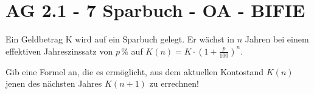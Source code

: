 \section{AG 2.1 - 7 Sparbuch - OA - BIFIE}

\begin{beispiel}[AG 2.1]{1} %
Ein Geldbetrag K wird auf ein Sparbuch gelegt. Er wächst in $n$ Jahren bei einem effektiven Jahreszinssatz von $p\,\%$ auf $K(n)=K\cdot \left(1+\frac{p}{100}\right)^n$.

\leer

Gib eine Formel an, die es ermöglicht, aus dem aktuellen Kontostand $K(n)$ jenen des nächsten Jahres $K(n+1)$ zu errechnen!	


\end{beispiel}

